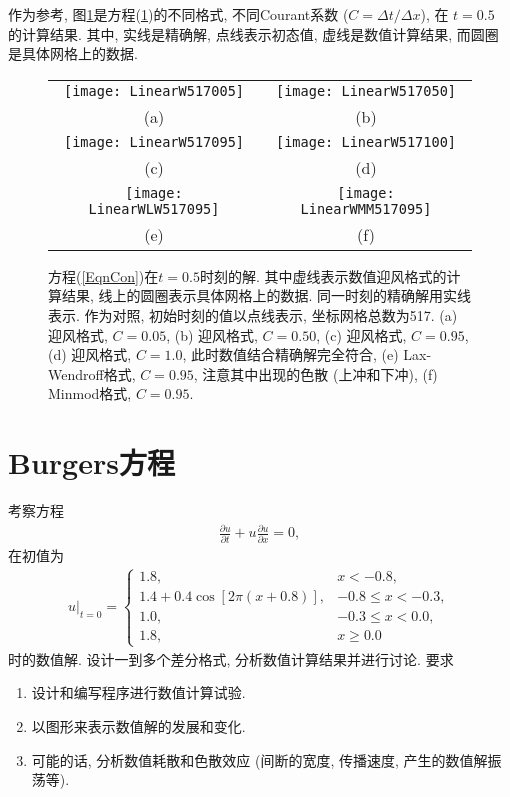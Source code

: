 \documentclass[10.5pt
]{article}
\begin{document}
作为参考, 图\ref{LinearW}是方程(\ref{LinearW})的不同格式, 不同Courant系数 ($C = \Delta t / \Delta x$), 在 $t = 0.5$ 的计算结果. 其中, 实线是精确解, 点线表示初态值, 虚线是数值计算结果, 而圆圈是具体网格上的数据. 
\begin{figure}
\begin{center}
\begin{tabular}{cc}
\texttt{[image: LinearW517005]}
&
\texttt{[image: LinearW517050]}
\\[-10pt]
(a) & (b)
\\[8pt]
\texttt{[image: LinearW517095]}
&
\texttt{[image: LinearW517100]}
\\[-10pt]
(c) & (d)
\\[8pt]
\texttt{[image: LinearWLW517095]}
&
\texttt{[image: LinearWMM517095]}
\\[-10pt]
(e) & (f)
\end{tabular}
\end{center}
\caption{方程(\ref{EqnCon})在$t=0.5$时刻的解. 其中虚线表示数值迎风格式的计算结果, 线上的圆圈表示具体网格上的数据. 同一时刻的精确解用实线表示. 作为对照, 初始时刻的值以点线表示, 坐标网格总数为517. (a) 迎风格式, $C = 0.05$, (b)  迎风格式, $C = 0.50$, (c)  迎风格式, $C = 0.95$, (d) 迎风格式, $C = 1.0$, 此时数值结合精确解完全符合, (e) Lax-Wendroff格式, $C=0.95$, 注意其中出现的色散 (上冲和下冲), (f) Minmod格式, $C=0.95$.} \label{LinearW}
\end{figure}

\section{Burgers方程}
考察方程
\begin{align}
\frac{\partial u}{\partial t} + u \frac{\partial u}{\partial x} = 0, \label{EqnBurgers}
\end{align}
在初值为
\begin{align}
u|_{t=0} = \left\{\begin{array}{ll} 1.8, & x < -0.8,
\\
1.4 + 0.4 \cos\left[2 \pi (x + 0.8) \right], & -0.8 \le x < -0.3,
\\
1.0, & -0.3 \le x < 0.0,
\\
1.8, & x \ge 0.0
\end{array} \right.
\end{align}
时的数值解. 设计一到多个差分格式, 分析数值计算结果并进行讨论. 要求
\begin{enumerate}
\item 设计和编写程序进行数值计算试验.
\item 以图形来表示数值解的发展和变化.
\item 可能的话, 分析数值耗散和色散效应 (间断的宽度, 传播速度, 产生的数值解振荡等).
\end{enumerate}
\end{document}
